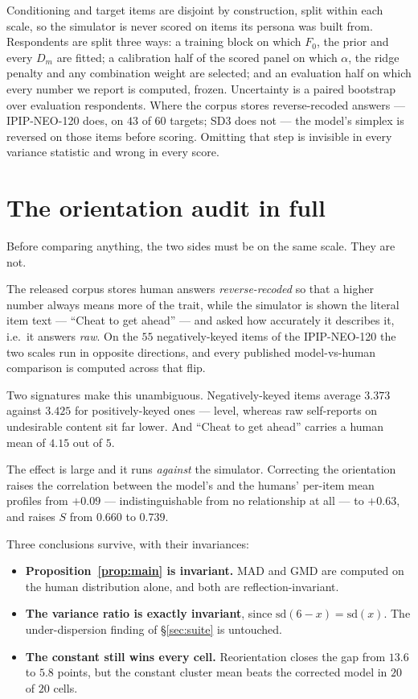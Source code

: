 \documentclass[11pt]{article}
\begin{document}
Conditioning and target items are disjoint by construction,
split within each scale, so the simulator is never scored on items its persona
was built from. Respondents are split three ways: a training block on which
$F_0$, the prior and every $D_m$ are fitted; a calibration half of the scored
panel on which $\alpha$, the ridge penalty and any combination weight are
selected; and an evaluation half on which every number we report is computed,
frozen. Uncertainty is a paired bootstrap over evaluation respondents. Where the
corpus stores reverse-recoded answers --- IPIP-NEO-120 does, on $43$ of $60$
targets; SD3 does not --- the model's simplex is reversed on those items before
scoring. Omitting that step is invisible in every variance statistic and wrong in
every score.

\section{The orientation audit in full}
\label{app:orientation}


Before comparing anything, the two sides must be on the same scale. They are not.

The released corpus stores human answers \emph{reverse-recoded} so that a higher
number always means more of the trait, while the simulator is shown the literal
item text --- ``Cheat to get ahead'' --- and asked how accurately it describes
it, i.e.\ it answers \emph{raw}. On the $55$ negatively-keyed items of the
IPIP-NEO-120 the two scales run in opposite directions, and every published
model-vs-human comparison is computed across that flip.

Two signatures make this unambiguous. Negatively-keyed items average $3.373$
against $3.425$ for positively-keyed ones --- level, whereas raw self-reports on
undesirable content sit far lower. And ``Cheat to get ahead'' carries a human
mean of $4.15$ out of $5$.

The effect is large and it runs \emph{against} the simulator. Correcting the
orientation raises the correlation between the model's and the humans' per-item
mean profiles from $+0.09$ --- indistinguishable from no relationship at all ---
to $+0.63$, and raises $S$ from $0.660$ to $0.739$.

Three conclusions survive, with their invariances:

\begin{itemize}\itemsep1pt
\item \textbf{Proposition~\ref{prop:main} is invariant.} $\mathrm{MAD}$ and
$\mathrm{GMD}$ are computed on the human distribution alone, and both are
reflection-invariant.
\item \textbf{The variance ratio is exactly invariant}, since
$\mathrm{sd}(6-x)=\mathrm{sd}(x)$. The under-dispersion finding of
\S\ref{sec:suite} is untouched.
\item \textbf{The constant still wins every cell.} Reorientation closes the gap
from $13.6$ to $5.8$ points, but the constant cluster mean beats the corrected
model in $20$ of $20$ cells.
\end{itemize}
\end{document}
